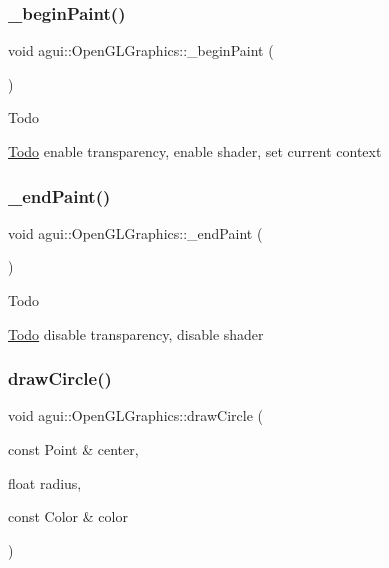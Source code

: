 \subsubsection{\texorpdfstring{\+\_\+begin\+Paint()}{\_beginPaint()}}
{\footnotesize\ttfamily void agui\+::\+Open\+G\+L\+Graphics\+::\+\_\+begin\+Paint (\begin{DoxyParamCaption}{ }\end{DoxyParamCaption})\hspace{0.3cm}{\ttfamily [override]}}

\begin{DoxyRefDesc}{Todo}
\item[\mbox{\hyperlink{todo__todo000005}{Todo}}]enable transparency, enable shader, set current context \end{DoxyRefDesc}
\mbox{\label{classagui_1_1_open_g_l_graphics_a744c073f057d938eec458a2517f5822a}} 
\subsubsection{\texorpdfstring{\+\_\+end\+Paint()}{\_endPaint()}}
{\footnotesize\ttfamily void agui\+::\+Open\+G\+L\+Graphics\+::\+\_\+end\+Paint (\begin{DoxyParamCaption}{ }\end{DoxyParamCaption})\hspace{0.3cm}{\ttfamily [override]}}

\begin{DoxyRefDesc}{Todo}
\item[\mbox{\hyperlink{todo__todo000006}{Todo}}]disable transparency, disable shader \end{DoxyRefDesc}
\mbox{\label{classagui_1_1_open_g_l_graphics_ade9a5b35baddea11cb56e40676572c45}} 
\subsubsection{\texorpdfstring{draw\+Circle()}{drawCircle()}}
{\footnotesize\ttfamily void agui\+::\+Open\+G\+L\+Graphics\+::draw\+Circle (\begin{DoxyParamCaption}\item[{const Point \&}]{center,  }\item[{float}]{radius,  }\item[{const Color \&}]{color }\end{DoxyParamCaption})\hspace{0.3cm}{\ttfamily [override]}}

